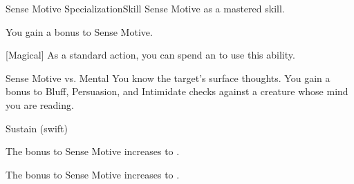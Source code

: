     \begin{feat}{Sense Motive Specialization}{Skill}
        \featpre Sense Motive as a mastered skill.
        \featben

         You gain a  bonus to Sense Motive.

        [Magical] As a standard action, you can spend an  to use this ability.
        \begin{ability}
            \begin{spelltargetinginfo}
            \end{spelltargetinginfo}
            \begin{spelleffects}
                \begin{spellattack}{Sense Motive vs. Mental}
                    \spellsuccess You know the target's surface thoughts.
                    You gain a  bonus to Bluff, Persuasion, and Intimidate checks against a creature whose mind you are reading.
                \end{spellattack}
                \spelldur Sustain (swift)
            \end{spelleffects}
        \end{ability}

         The bonus to Sense Motive increases to .

         The bonus to Sense Motive increases to .
    \end{feat}

